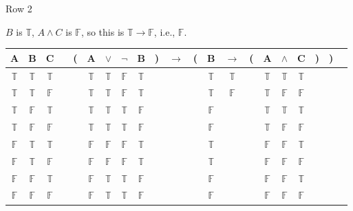 \documentclass[
  ignorenonframetext,
]{beamer}
\renewcommand{\,}{\text{, }}
\def\True{\mathbb{T}}
\def\False{\mathbb{F}}
\begin{document}
\begin{frame}{Row 2}
\protect\hypertarget{row-2}{}

\(B\) is \(\True\), \(A \wedge C\) is \(\False\), so this is
\(\True \rightarrow \False\), i.e., \(\False\).

\begin{center}
\bigskip
\begin{tabular}{@{ }c@{ }@{ }c@{ }@{ }c | c@{ }@{}c@{}@{ }c@{ }@{ }c@{ }@{ }c@{ }@{ }c@{ }@{}c@{}@{ }c@{ }@{}c@{}@{ }c@{ }@{ }c@{ }@{}c@{}@{ }c@{ }@{ }c@{ }@{ }c@{ }@{}c@{}@{}c@{}@{ }c}
A & B & C &  & ( & A & $\vee$ & $\neg$ & B & ) & $\rightarrow$ & ( & B & $\rightarrow$ & ( & A & $\wedge$ & C & ) & ) & \\
\hline 
 $\True$ & $\True$ & $\True$ &  &  & $\True$ & $\True$ & $\False$ & $\True$ &  &&  & $\True$ & $\True$ &  & $\True$ & $\True$ & $\True$ &  &  & \\
 $\True$ & $\True$ & $\False$ &  &  & $\True$ & $\True$ & $\False$ & $\True$ &  &&  & $\True$ & $\False$ &  & $\True$ & $\False$ & $\False$ &  &  & \\
 $\True$ & $\False$ & $\True$ &  &  & $\True$ & $\True$ & $\True$ & $\False$ &  &&  & $\False$ &&  & $\True$ & $\True$ & $\True$ &  &  & \\
 $\True$ & $\False$ & $\False$ &  &  & $\True$ & $\True$ & $\True$ & $\False$ &  &&  & $\False$ &&  & $\True$ & $\False$ & $\False$ &  &  & \\
 $\False$ & $\True$ & $\True$ &  &  & $\False$ & $\False$ & $\False$ & $\True$ &  &&  & $\True$ &&  & $\False$ & $\False$ & $\True$ &  &  & \\
 $\False$ & $\True$ & $\False$ &  &  & $\False$ & $\False$ & $\False$ & $\True$ &  &&  & $\True$ &&  & $\False$ & $\False$ & $\False$ &  &  & \\
 $\False$ & $\False$ & $\True$ &  &  & $\False$ & $\True$ & $\True$ & $\False$ &  &&  & $\False$ &&  & $\False$ & $\False$ & $\True$ &  &  & \\
 $\False$ & $\False$ & $\False$ &  &  & $\False$ & $\True$ & $\True$ & $\False$ &  &&  & $\False$ &&  & $\False$ & $\False$ & $\False$ &  &  & \\
\end{tabular}
\bigskip
\end{center}

\end{frame}
\end{document}
